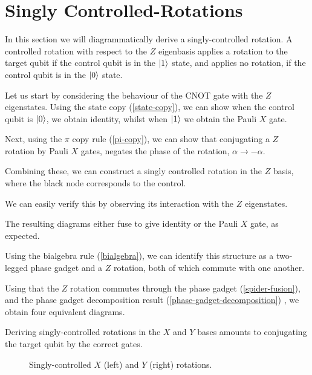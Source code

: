 \section{Singly Controlled-Rotations}

In this section we will diagrammatically derive a singly-controlled rotation. A controlled rotation with respect to the $Z$ eigenbasis applies a rotation to the target qubit if the control qubit is in the $\ket 1$ state, and applies no rotation, if the control qubit is in the $\ket 0$ state.

Let us start by considering the behaviour of the CNOT gate with the $Z$ eigenstates. Using the state copy (\ref{state-copy}), we can show when the control qubit is $\ket 0$, we obtain identity, whilst when $\ket 1$ we obtain the Pauli $X$ gate.


Next, using the $\pi$ copy rule (\ref{pi-copy}), we can show that conjugating a $Z$ rotation by Pauli $X$ gates, negates the phase of the rotation, $\alpha \rightarrow -\alpha$.


Combining these, we can construct a singly controlled rotation in the $Z$ basis, where the black node corresponds to the control.


We can easily verify this by observing its interaction with the $Z$ eigenstates.



The resulting diagrams either fuse to give identity or the Pauli $X$ gate, as expected.


Using the bialgebra rule (\ref{bialgebra}), we can identify this structure as a two-legged phase gadget and a $Z$ rotation, both of which commute with one another.


Using that the $Z$ rotation commutes through the phase gadget (\ref{spider-fusion}), and the phase gadget decomposition result (\ref{phase-gadget-decomposition}) , we obtain four equivalent diagrams. 


Deriving singly-controlled rotations in the $X$ and $Y$ bases amounts to conjugating the target qubit by the correct gates.

\begin{figure}[H]
    \centering
    \caption{Singly-controlled $X$ (left) and $Y$ (right) rotations.}
\end{figure}

